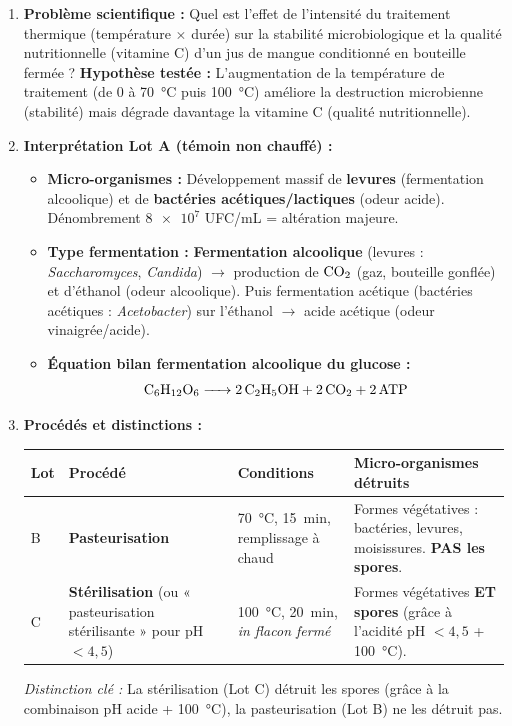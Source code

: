 \documentclass[11pt]{article}
\begin{document}
\begin{corrige}
\begin{enumerate}
\item \textbf{Problème scientifique :} Quel est l'effet de l'intensité du traitement thermique (température $\times$ durée) sur la stabilité microbiologique et la qualité nutritionnelle (vitamine C) d'un jus de mangue conditionné en bouteille fermée ?
\textbf{Hypothèse testée :} L'augmentation de la température de traitement (de 0 à \SI{70}{\degreeCelsius} puis \SI{100}{\degreeCelsius}) améliore la destruction microbienne (stabilité) mais dégrade davantage la vitamine C (qualité nutritionnelle).

\item \textbf{Interprétation Lot A (témoin non chauffé) :}
\begin{itemize}
\item \textbf{Micro-organismes :} Développement massif de \textbf{levures} (fermentation alcoolique) et de \textbf{bactéries acétiques/lactiques} (odeur acide). Dénombrement $\num{8e7}$ UFC/mL = altération majeure.
\item \textbf{Type fermentation :} \textbf{Fermentation alcoolique} (levures : \emph{Saccharomyces}, \emph{Candida}) $\to$ production de $\ce{CO2}$ (gaz, bouteille gonflée) et d'éthanol (odeur alcoolique). Puis fermentation acétique (bactéries acétiques : \emph{Acetobacter}) sur l'éthanol $\to$ acide acétique (odeur vinaigrée/acide).
\item \textbf{Équation bilan fermentation alcoolique du glucose :}
\[ \ce{C6H12O6 -> 2 C2H5OH + 2 CO2 + 2 ATP} \]
\end{itemize}

\item \textbf{Procédés et distinctions :}
\begin{center}
\begin{tabularx}{\linewidth}{|l|X|X|X|}\hline
\rowcolor{popblueL} \textbf{Lot} & \textbf{Procédé} & \textbf{Conditions} & \textbf{Micro-organismes détruits} \\ \hline
B & \textbf{Pasteurisation} & \SI{70}{\degreeCelsius}, \SI{15}{\minute}, remplissage à chaud & Formes végétatives : bactéries, levures, moisissures. \textbf{PAS les spores}. \\ \hline
C & \textbf{Stérilisation} (ou « pasteurisation stérilisante » pour pH $< 4,5$) & \SI{100}{\degreeCelsius}, \SI{20}{\minute}, \emph{in flacon fermé} & Formes végétatives \textbf{ET spores} (grâce à l'acidité pH $< 4,5$ + \SI{100}{\degreeCelsius}). \\ \hline
\end{tabularx}
\end{center}
\textit{Distinction clé :} La stérilisation (Lot C) détruit les spores (grâce à la combinaison pH acide + \SI{100}{\degreeCelsius}), la pasteurisation (Lot B) ne les détruit pas.


\end{enumerate}
\end{corrige}
\end{document}
